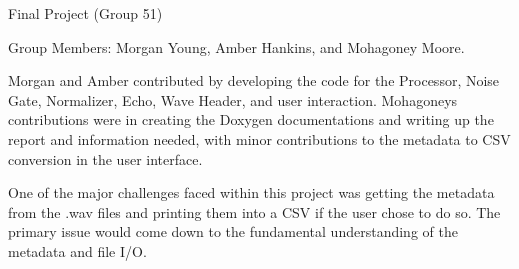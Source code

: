 Final Project (Group 51)


\begin{DoxyEnumerate}
\item Group Members\+: Morgan Young, Amber Hankins, and Mohagoney Moore.
\item Morgan and Amber contributed by developing the code for the Processor, Noise Gate, Normalizer, Echo, Wave Header, and user interaction. Mohagoney\textquotesingle{}s contributions were in creating the Doxygen documentations and writing up the report and information needed, with minor contributions to the metadata to C\+SV conversion in the user interface.
\item 
\item One of the major challenges faced within this project was getting the metadata from the .wav files and printing them into a C\+SV if the user chose to do so. The primary issue would come down to the fundamental understanding of the metadata and file I/O. 
\end{DoxyEnumerate}